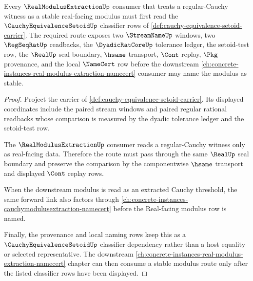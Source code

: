 \begin{theorem}
\label{thm:cauchy-equivalence-setoid-real-modulus-extraction-forward-link}
Every $\RealModulusExtractionUp$ consumer that treats a regular-Cauchy
witness as a stable real-facing modulus must first read the
$\CauchyEquivalenceSetoidUp$ classifier rows of
\autoref{def:cauchy-equivalence-setoid-carrier}. The required route exposes
two $\StreamNameUp$ windows, two $\RegSeqRatUp$ readbacks, the
$\DyadicRatCoreUp$ tolerance ledger, the setoid-test row, the $\RealUp$ seal
boundary, $\hsame$ transport, $\Cont$ replay, $\Pkg$ provenance, and the local
$\NameCert$ row before the downstream
\autoref{ch:concrete-instances-real-modulus-extraction-namecert} consumer may
name the modulus as stable.
\end{theorem}
\begin{proof}
Project the carrier of \autoref{def:cauchy-equivalence-setoid-carrier}. Its
displayed coordinates include the paired stream windows and paired regular
rational readbacks whose comparison is measured by the dyadic tolerance
ledger and the setoid-test row.

The $\RealModulusExtractionUp$ consumer reads a regular-Cauchy witness only as
real-facing data. Therefore the route must pass through the same $\RealUp$
seal boundary and preserve the comparison by the componentwise $\hsame$
transport and displayed $\Cont$ replay rows.

When the downstream modulus is read as an extracted Cauchy threshold, the same
forward link also factors through
\autoref{ch:concrete-instances-cauchymodulusextraction-namecert} before the
Real-facing modulus row is named.

Finally, the provenance and local naming rows keep this as a
$\CauchyEquivalenceSetoidUp$ classifier dependency rather than a host equality
or selected representative. The downstream
\autoref{ch:concrete-instances-real-modulus-extraction-namecert} chapter can
then consume a stable modulus route only after the listed classifier rows have
been displayed.
\end{proof}
